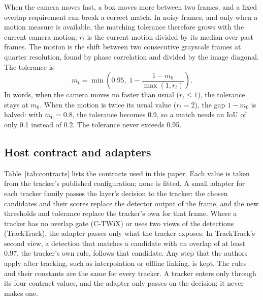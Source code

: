 \documentclass[pdflatex,sn-mathphys-num]{sn-jnl}
\begin{document}
When the camera moves fast, a box moves more between two frames, and a fixed
overlap requirement can break a correct match. In noisy frames, and only when
a motion measure is available, the matching tolerance therefore grows with
the current camera motion; $r_t$ is the current motion divided by its median
over past frames. The motion is the shift between two consecutive grayscale
frames at quarter resolution, found by phase correlation
\cite{reddy1996phasecorr} and divided by the image diagonal. The tolerance is
\begin{equation}
m_t=\min\!\left(0.95,\;1-\frac{1-m_0}{\max(1,r_t)}\right).
\label{eq:motion}
\end{equation}
In words, when the camera moves no faster than usual ($r_t\le1$), the
tolerance stays at $m_0$. When the motion is twice its usual value
($r_t=2$), the gap $1-m_0$ is halved: with $m_0=0.8$, the tolerance becomes
0.9, so a match needs an IoU of only 0.1 instead of 0.2. The tolerance never
exceeds 0.95.

\subsection{Host contract and adapters}\label{sec:contract}
Table~\ref{tab:contracts} lists the contracts used in this paper. Each value
is taken from the tracker's published configuration; none is fitted. A small
adapter for each tracker family passes the layer's decision to the tracker:
the chosen candidates and their scores replace the detector output of the
frame, and the new thresholds and tolerance replace the tracker's own for
that frame. Where a tracker has no overlap gate (C-TWiX) or uses two views of
the detections (TrackTrack), the adapter passes only what the tracker exposes.
In TrackTrack's second view, a detection that matches a candidate with an
overlap of at least 0.97, the tracker's own rule, follows that candidate. Any step that the authors apply after tracking, such as
interpolation or offline linking, is kept. The rules and their constants are
the same for every tracker. A tracker enters only through its four contract
values, and the adapter only passes on the decision; it never makes one.
\end{document}
